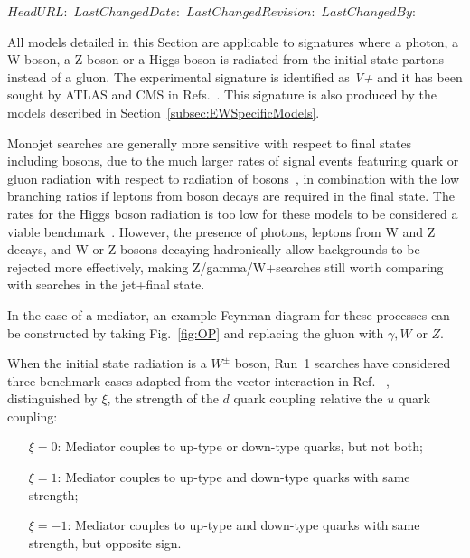 \svnidlong
{$HeadURL: $}
{$LastChangedDate: $}
{$LastChangedRevision: $}
{$LastChangedBy: $}

All models detailed in this Section are applicable to signatures where 
 a photon, a W boson, a Z boson or a Higgs boson
 is radiated from the initial state partons instead of a gluon. 
The experimental signature is identified as \textit{V+\MET} and it
has been sought by ATLAS and CMS in Refs.~\cite{Khachatryan:2014rwa,Aad:2014tda,Khachatryan:2014tva,ATLAS:2014wra,Aad:2013oja,Aad:2014vka}. 
This signature is also produced by the models described in 
Section~\ref{subsec:EWSpecificModels}.

Monojet searches are generally more sensitive
with respect to final states including bosons, due to the much
larger rates of signal events featuring quark or gluon radiation with
respect to radiation of bosons~\cite{Zhou:2013fla},
in combination with the low branching ratios if leptons from
boson decays are required in the final state.
The rates for the Higgs boson radiation is too low for these models
to be considered a viable benchmark~\cite{Carpenter:2013xra}.
However, the presence of photons,
leptons from W and Z decays,
and W or Z bosons decaying hadronically
allow backgrounds to be rejected more effectively,
making Z/gamma/W+\MET searches
still worth comparing with searches in the jet+\MET final state.



In the case of a \spinone mediator,
an example Feynman diagram for these processes can be constructed by taking
Fig.~\ref{fig:OP} and replacing the gluon with $\gamma,W$ or $Z$.

When the initial state radiation is a $W^\pm$ boson, Run~1 searches have considered three benchmark cases adapted from the vector interaction in Ref. ~\cite{Bai:2012xg}, distinguished by $\xi$, the strength of the $d$ quark coupling relative the $u$ quark coupling:
\begin{itemize}
 \item[$\xi=0$:] Mediator couples to up-type or down-type quarks, but not both;
 \item[$\xi=1$:] Mediator couples to up-type and down-type quarks with same strength;
 \item[$\xi=-1$:] Mediator couples to up-type and down-type quarks with same strength, but opposite sign.
\end{itemize}

